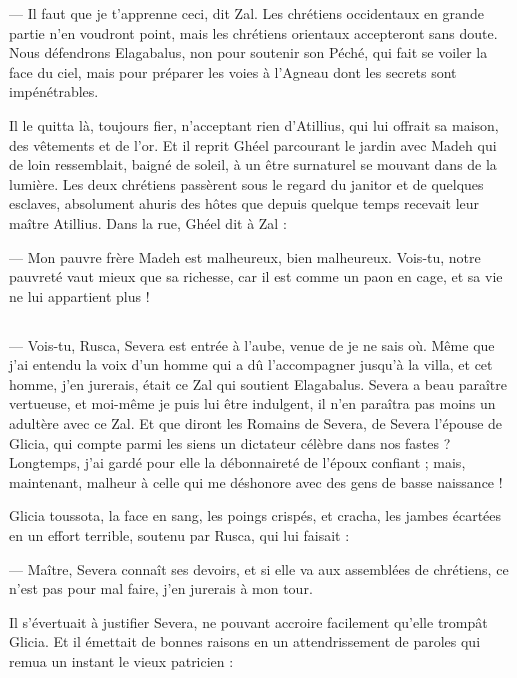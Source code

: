 \documentclass[a4paper, 11pt, oneside, polutonikogreek, french]{article}
\begin{document}
--- Il faut que je t'apprenne ceci, dit Zal. Les chrétiens occidentaux en grande partie n'en voudront point, mais les chrétiens orientaux accepteront sans doute. Nous défendrons Elagabalus, non pour soutenir son Péché, qui fait se voiler la face du ciel, mais pour préparer les voies à l'Agneau dont les secrets sont impénétrables.

Il le quitta là, toujours fier, n'acceptant rien d'Atillius, qui lui offrait sa maison, des vêtements et de l'or. Et il reprit Ghéel parcourant le jardin avec Madeh qui de loin ressemblait, baigné de soleil, à un être surnaturel se mouvant dans de la lumière. Les deux chrétiens passèrent sous le regard du janitor et de quelques esclaves, absolument ahuris des hôtes que depuis quelque temps recevait leur maître Atillius. Dans la rue, Ghéel dit à Zal :

--- Mon pauvre frère Madeh est malheureux, bien malheureux. Vois-tu, notre pauvreté vaut mieux que sa richesse, car il est comme un paon en cage, et sa vie ne lui appartient plus !
\clearpage
\subsection{}
\paragraph{}
--- Vois-tu, Rusca, Severa est entrée à l'aube, venue de je ne sais où. Même que j'ai entendu la voix d'un homme qui a dû l'accompagner jusqu'à la villa, et cet homme, j'en jurerais, était ce Zal qui soutient Elagabalus. Severa a beau paraître vertueuse, et moi-même je puis lui être indulgent, il n'en paraîtra pas moins un adultère avec ce Zal. Et que diront les Romains de Severa, de Severa l'épouse de Glicia, qui compte parmi les siens un dictateur célèbre dans nos fastes ? Longtemps, j'ai gardé pour elle la débonnaireté de l'époux confiant ; mais, maintenant, malheur à celle qui me déshonore avec des gens de basse naissance !

Glicia toussota, la face en sang, les poings crispés, et cracha, les jambes écartées en un effort terrible, soutenu par Rusca, qui lui faisait :

--- Maître, Severa connaît ses devoirs, et si elle va aux assemblées de chrétiens, ce n'est pas pour mal faire, j'en jurerais à mon tour.

Il s'évertuait à justifier Severa, ne pouvant accroire facilement qu'elle trompât Glicia. Et il émettait de bonnes raisons en un attendrissement de paroles qui remua un instant le vieux patricien :
\end{document}
